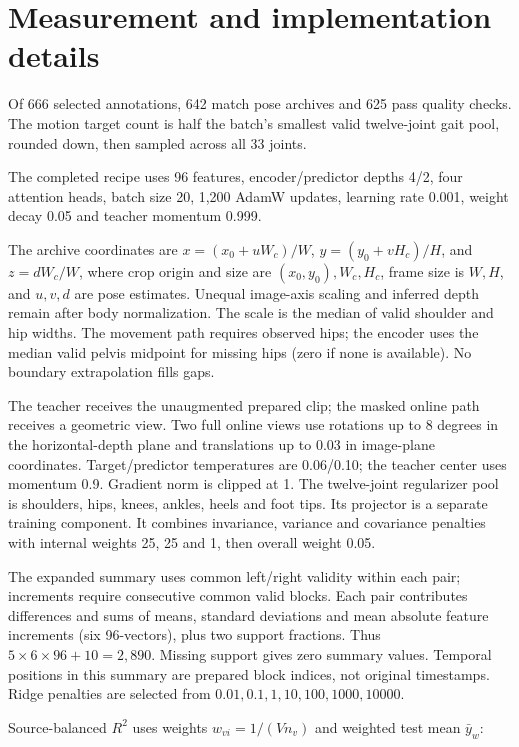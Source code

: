 \documentclass{article}
\begin{document}
\section{Measurement and implementation
details}\label{measurement-and-implementation-details}

Of 666 selected annotations, 642 match pose archives and 625 pass
quality checks. The motion target count is half the batch's smallest
valid twelve-joint gait pool, rounded down, then sampled across all 33
joints.

The completed recipe uses 96 features, encoder/predictor depths 4/2,
four attention heads, batch size 20, 1,200 AdamW updates, learning rate
0.001, weight decay 0.05 and teacher momentum 0.999.

The archive coordinates are \(x=(x_0+uW_c)/W\), \(y=(y_0+vH_c)/H\), and
\(z=dW_c/W\), where crop origin and size are \((x_0,y_0),W_c,H_c\),
frame size is \(W,H\), and \(u,v,d\) are pose estimates. Unequal
image-axis scaling and inferred depth remain after body normalization.
The scale is the median of valid shoulder and hip widths. The movement
path requires observed hips; the encoder uses the median valid pelvis
midpoint for missing hips (zero if none is available). No boundary
extrapolation fills gaps.

The teacher receives the unaugmented prepared clip; the masked online
path receives a geometric view. Two full online views use rotations up
to 8 degrees in the horizontal-depth plane and translations up to 0.03
in image-plane coordinates. Target/predictor temperatures are 0.06/0.10;
the teacher center uses momentum 0.9. Gradient norm is clipped at 1. The
twelve-joint regularizer pool is shoulders, hips, knees, ankles, heels
and foot tips. Its projector is a separate training component. It
combines invariance, variance and covariance penalties with internal
weights 25, 25 and 1, then overall weight 0.05.

The expanded summary uses common left/right validity within each pair;
increments require consecutive common valid blocks. Each pair
contributes differences and sums of means, standard deviations and mean
absolute feature increments (six 96-vectors), plus two support
fractions. Thus \(5\times6\times96+10=2,890\). Missing support gives
zero summary values. Temporal positions in this summary are prepared
block indices, not original timestamps. Ridge penalties are selected
from \(0.01,0.1,1,10,100,1000,10000\).

Source-balanced \(R^2\) uses weights \(w_{vi}=1/(Vn_v)\) and weighted
test mean \(\bar y_w\):
\end{document}
